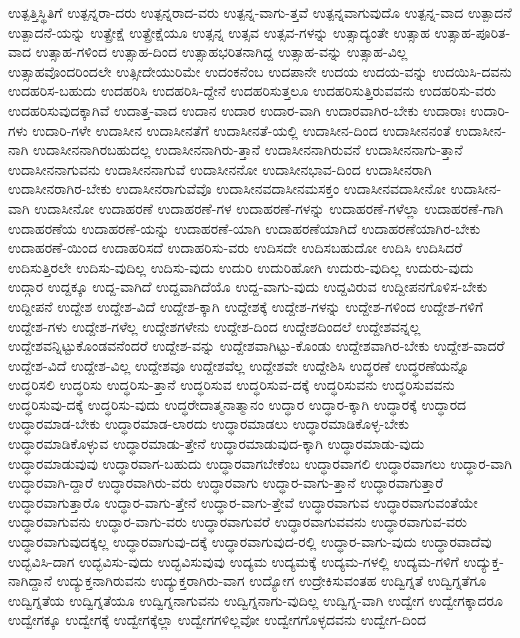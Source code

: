 {ಉತ್ಪತ್ತಿಸ್ಥಿತಿಗೆ
ಉತ್ಪನ್ನರಾ-ದರು
ಉತ್ಪನ್ನರಾದ-ವರು
ಉತ್ಪನ್ನ-ವಾಗು-ತ್ತವೆ
ಉತ್ಪನ್ನವಾಗುವುದೊ
ಉತ್ಪನ್ನ-ವಾದ
ಉತ್ಪಾದನೆ
ಉತ್ಪಾದನೆ-ಯನ್ನು
ಉತ್ಪ್ರೇಕ್ಷೆ
ಉತ್ಪ್ರೇಕ್ಷೆಯೂ
ಉತ್ಸನ್ನ
ಉತ್ಸವ
ಉತ್ಸವ-ಗಳನ್ನು
ಉತ್ಸಾದ್ಯಂತೇ
ಉತ್ಸಾಹ
ಉತ್ಸಾಹ-ಪೂರಿತ-ವಾದ
ಉತ್ಸಾಹ-ಗಳಿಂದ
ಉತ್ಸಾಹ-ದಿಂದ
ಉತ್ಸಾಹಭರಿತನಾಗಿದ್ದ
ಉತ್ಸಾಹ-ವನ್ನು
ಉತ್ಸಾಹ-ವಿಲ್ಲ
ಉತ್ಸಾಹವೊಂದರಿಂದಲೇ
ಉತ್ಸೀದೇಯುರಿಮೇ
ಉದಂಕನೆಂಬ
ಉದಪಾನೇ
ಉದಯ
ಉದಯ-ವನ್ನು
ಉದಯಿಸಿ-ದವನು
ಉದಹರಿಸ-ಬಹುದು
ಉದಹರಿಸಿ
ಉದಹರಿಸಿ-ದ್ದೇನೆ
ಉದಹರಿಸುತ್ತಲೂ
ಉದಹರಿಸುತ್ತಿರುವವನು
ಉದಹರಿಸು-ವರು
ಉದಹರಿಸುವುದಕ್ಕಾಗಿವೆ
ಉದಾತ್ತ-ವಾದ
ಉದಾನ
ಉದಾರ
ಉದಾರ-ವಾಗಿ
ಉದಾರವಾಗಿರ-ಬೇಕು
ಉದಾರಾಃ
ಉದಾರಿ-ಗಳು
ಉದಾರಿ-ಗಳೇ
ಉದಾಸೀನ
ಉದಾಸೀನತೆಗೆ
ಉದಾಸೀನತೆ-ಯಲ್ಲಿ
ಉದಾಸೀನ-ದಿಂದ
ಉದಾಸೀನನಂತೆ
ಉದಾಸೀನ-ನಾಗಿ
ಉದಾಸೀನನಾಗಿರಬಹುದಲ್ಲ
ಉದಾಸೀನನಾಗಿರು-ತ್ತಾನೆ
ಉದಾಸೀನನಾಗಿರುವನೆ
ಉದಾಸೀನನಾಗು-ತ್ತಾನೆ
ಉದಾಸೀನನಾಗುವನು
ಉದಾಸೀನನಾಗುವೆ
ಉದಾಸೀನನೋ
ಉದಾಸೀನಭಾವ-ದಿಂದ
ಉದಾಸೀನರಾಗಿ
ಉದಾಸೀನರಾಗಿರ-ಬೇಕು
ಉದಾಸೀನರಾಗುವೆವೊ
ಉದಾಸೀನವದಾಸೀನಮಸಕ್ತಂ
ಉದಾಸೀನವದಾಸೀನೋ
ಉದಾಸೀನ-ವಾಗಿ
ಉದಾಸೀನೋ
ಉದಾಹರಣೆ
ಉದಾಹರಣೆ-ಗಳ
ಉದಾಹರಣೆ-ಗಳನ್ನು
ಉದಾಹರಣೆ-ಗಳೆಲ್ಲಾ
ಉದಾಹರಣೆ-ಗಾಗಿ
ಉದಾಹರಣೆಯ
ಉದಾಹರಣೆ-ಯನ್ನು
ಉದಾಹರಣೆ-ಯಾಗಿ
ಉದಾಹರಣೆಯಾಗಿದೆ
ಉದಾಹರಣೆಯಾಗಿರ-ಬೇಕು
ಉದಾಹರಣೆ-ಯಿಂದ
ಉದಾಹರಿಸದೆ
ಉದಾಹರಿಸು-ವರು
ಉದಿಸದೇ
ಉದಿಸಬಹುದೋ
ಉದಿಸಿ
ಉದಿಸಿದರೆ
ಉದಿಸುತ್ತಿರಲೇ
ಉದಿಸು-ವುದಿಲ್ಲ
ಉದಿಸು-ವುದು
ಉದುರಿ
ಉದುರಿಹೋಗಿ
ಉದುರು-ವುದಿಲ್ಲ
ಉದುರು-ವುದು
ಉದ್ಗಾರ
ಉದ್ದಕ್ಕೂ
ಉದ್ದ-ವಾಗಿದೆ
ಉದ್ದವಾಗಿದೆಯೊ
ಉದ್ದ-ವಾಗು-ವುದು
ಉದ್ದವಿರುವ
ಉದ್ದೀಪನಗೊಳಿಸ-ಬೇಕು
ಉದ್ದೀಪನೆ
ಉದ್ದೇಶ
ಉದ್ದೇಶ-ವಿದೆ
ಉದ್ದೇಶ-ಕ್ಕಾಗಿ
ಉದ್ದೇಶಕ್ಕೆ
ಉದ್ದೇಶ-ಗಳನ್ನು
ಉದ್ದೇಶ-ಗಳಿಂದ
ಉದ್ದೇಶ-ಗಳಿಗೆ
ಉದ್ದೇಶ-ಗಳು
ಉದ್ದೇಶ-ಗಳೆಲ್ಲ
ಉದ್ದೇಶಗಳೇನು
ಉದ್ದೇಶ-ದಿಂದ
ಉದ್ದೇಶದಿಂದಲೆ
ಉದ್ದೇಶವನ್ನಲ್ಲ
ಉದ್ದೇಶವನ್ನಿಟ್ಟುಕೊಂಡವನೆಂದರೆ
ಉದ್ದೇಶ-ವನ್ನು
ಉದ್ದೇಶವಾಗಿಟ್ಟು-ಕೊಂಡು
ಉದ್ದೇಶವಾಗಿರ-ಬೇಕು
ಉದ್ದೇಶ-ವಾದರೆ
ಉದ್ದೇಶ-ವಿದೆ
ಉದ್ದೇಶ-ವಿಲ್ಲ
ಉದ್ದೇಶವೂ
ಉದ್ದೇಶವೆಲ್ಲ
ಉದ್ದೇಶವೇ
ಉದ್ದೇಶಿಸಿ
ಉದ್ಧರಣೆ
ಉದ್ಧರಣೆಯನ್ನೊ
ಉದ್ಧರಿಸಲಿ
ಉದ್ಧರಿಸು
ಉದ್ಧರಿಸು-ತ್ತಾನೆ
ಉದ್ಧರಿಸುವ
ಉದ್ಧರಿಸುವ-ದಕ್ಕೆ
ಉದ್ಧರಿಸುವನು
ಉದ್ಧರಿಸುವವನು
ಉದ್ಧರಿಸುವು-ದಕ್ಕೆ
ಉದ್ಧರಿಸು-ವುದು
ಉದ್ಧರೇದಾತ್ಮನಾತ್ಮಾನಂ
ಉದ್ಧಾರ
ಉದ್ಧಾರ-ಕ್ಕಾಗಿ
ಉದ್ಧಾರಕ್ಕೆ
ಉದ್ಧಾರದ
ಉದ್ಧಾರಮಾಡ-ಬೇಕು
ಉದ್ಧಾರಮಾಡ-ಲಾರದು
ಉದ್ಧಾರಮಾಡಲು
ಉದ್ಧಾರಮಾಡಿಕೊಳ್ಳ-ಬೇಕು
ಉದ್ಧಾರಮಾಡಿಕೊಳ್ಳುವ
ಉದ್ಧಾರಮಾಡು-ತ್ತೇನೆ
ಉದ್ಧಾರಮಾಡುವುದ-ಕ್ಕಾಗಿ
ಉದ್ಧಾರಮಾಡು-ವುದು
ಉದ್ಧಾರಮಾಡುವುವು
ಉದ್ಧಾರವಾಗ-ಬಹುದು
ಉದ್ಧಾರವಾಗಬೇಕೆಂಬ
ಉದ್ಧಾರವಾಗಲಿ
ಉದ್ಧಾರವಾಗಲು
ಉದ್ಧಾರ-ವಾಗಿ
ಉದ್ಧಾರವಾಗಿ-ದ್ದಾರೆ
ಉದ್ಧಾರವಾಗಿರು-ವರು
ಉದ್ಧಾರವಾಗು
ಉದ್ಧಾರ-ವಾಗು-ತ್ತಾನೆ
ಉದ್ಧಾರವಾಗುತ್ತಾರೆ
ಉದ್ಧಾರವಾಗುತ್ತಾರೊ
ಉದ್ಧಾರ-ವಾಗು-ತ್ತೇನೆ
ಉದ್ಧಾರ-ವಾಗು-ತ್ತೇವೆ
ಉದ್ಧಾರವಾಗುವ
ಉದ್ಧಾರವಾಗುವಂತೆಯೇ
ಉದ್ಧಾರವಾಗುವನು
ಉದ್ಧಾರ-ವಾಗು-ವರು
ಉದ್ಧಾರವಾಗುವರೆ
ಉದ್ಧಾರವಾಗುವವನು
ಉದ್ಧಾರವಾಗುವ-ವರು
ಉದ್ಧಾರವಾಗುವುದಕ್ಕಲ್ಲ
ಉದ್ಧಾರವಾಗುವು-ದಕ್ಕೆ
ಉದ್ಧಾರವಾಗುವುದ-ರಲ್ಲಿ
ಉದ್ಧಾರ-ವಾಗು-ವುದು
ಉದ್ಧಾರವಾದೆವು
ಉದ್ಭವಿಸಿ-ದಾಗ
ಉದ್ಭವಿಸು-ವುದು
ಉದ್ಭವಿಸುವುವು
ಉದ್ಯಮ
ಉದ್ಯಮಕ್ಕೆ
ಉದ್ಯಮ-ಗಳಲ್ಲಿ
ಉದ್ಯಮ-ಗಳಿಗೆ
ಉದ್ಯುಕ್ತ-ನಾಗಿದ್ದಾನೆ
ಉದ್ಯುಕ್ತನಾಗಿರುವನು
ಉದ್ಯುಕ್ತರಾಗಿರು-ವಾಗ
ಉದ್ಯೋಗ
ಉದ್ರೇಕಿಸುವಂತಹ
ಉದ್ವಿಗ್ನತೆ
ಉದ್ವಿಗ್ನತೆಗೂ
ಉದ್ವಿಗ್ನತೆಯ
ಉದ್ವಿಗ್ನತೆಯೂ
ಉದ್ವಿಗ್ನನಾಗುವನು
ಉದ್ವಿಗ್ನನಾಗು-ವುದಿಲ್ಲ
ಉದ್ವಿಗ್ನ-ವಾಗಿ
ಉದ್ವೇಗ
ಉದ್ವೇಗಕ್ಕಾದರೂ
ಉದ್ವೇಗಕ್ಕೂ
ಉದ್ವೇಗಕ್ಕೆ
ಉದ್ವೇಗಕ್ಕೆಲ್ಲಾ
ಉದ್ವೇಗಗಳಿಲ್ಲವೋ
ಉದ್ವೇಗಗೊಳ್ಳದವನು
ಉದ್ವೇಗ-ದಿಂದ
}
